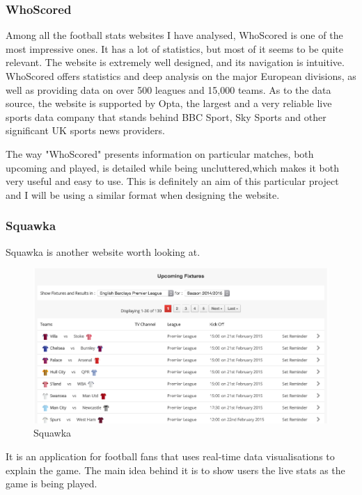 \subsubsection{WhoScored}
\label{subsubsec:whoscored_req}
Among all the football stats websites I have analysed, WhoScored is one of the most impressive ones. It has a lot of statistics, but most of it seems to be quite relevant. The website is extremely well designed, and its navigation is intuitive. WhoScored offers statistics and deep analysis on the major European divisions, as well as providing data on over 500 leagues and 15,000 teams. As to the data source, the website is supported by Opta, the largest and a very reliable live sports data company that stands behind BBC Sport, Sky Sports and other significant UK sports news providers.

The way "WhoScored" presents information on particular matches, both upcoming and played, is detailed while being uncluttered,which makes it both very useful and easy to use. This is definitely an aim of this particular project and I will be using a similar format when designing the website. 

\subsubsection{Squawka}
\label{subsubsec:squawka_req}	
Squawka is another website worth looking at. 
		
\begin{figure}[H]
	\begin{center}
		\includegraphics[width=.80\linewidth,natwidth=610,natheight=642]{req/images/squawka.png}
		\caption{Squawka} \label{fig:using:squawka}
	\end{center}
\end{figure}
	
It is an application for football fans that uses real-time data visualisations to explain the game. The main idea behind it is to show users the live stats as the game is being played. 

